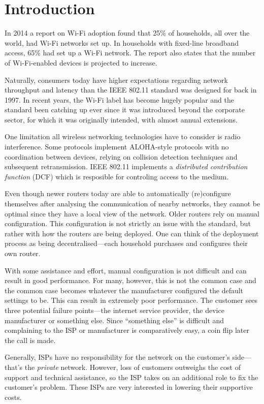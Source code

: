 \chapter{Introduction}

In 2014 a report on Wi-Fi adoption found that 25\% of households, all over the world, had Wi-Fi networks set up. In households with fixed-line broadband access, 65\% had set up a Wi-Fi network\cite{smith}. The report also states that the number of Wi-Fi-enabled devices is projected to increase. 

Naturally, consumers today have higher expectations regarding network throughput and latency than the IEEE 802.11 standard was designed for back in 1997. In recent years, the Wi-Fi label has become hugely popular and the standard been catching up ever since it was introduced beyond the corporate sector, for which it was originally intended, with almost annual extensions.

One limitation all wireless networking technologies have to consider is radio interference. Some protocols implement ALOHA-style protocols with no coordination between devices, relying on collision detection techniques and subsequent retransmission. IEEE 802.11 implements a \emph{distributed contribution function} (DCF) which is resposible for controling access to the medium.

Even though newer routers today are able to automatically (re)configure themselves after analysing the communication of nearby networks, they cannot be optimal since they have a local view of the network. Older routers rely on manual configuration. This configuration is not strictly an issue with the standard, but rather with how the routers are being deployed. One can think of the deployment process as being decentralised—each household purchases and configures their own router. 

With some assistance and effort, manual configuration is not difficult and can result in good performance. For many, however, this is not the common case and the common case becomes whatever the manufacturer configured the default settings to be. This can result in extremely poor performance. The customer sees three potential failure points—the internet service provider, the device manufacturer or something else. Since ``something else'' is difficult and complaining to the ISP or manufacturer is comparatively easy, a coin flip later the call is made.

Generally, ISPs have no responsibility for the network on the customer's side---that's the \emph{private} network. However, loss of customers outweighs the cost of support and technical assistance, so the ISP takes on an additional role to fix the customer's problem. These ISPs are very interested in lowering their supportive costs.

